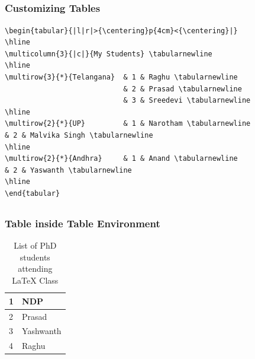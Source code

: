 \documentclass[12pt]{beamer}
\begin{document}
\begin{frame}[shrink=20,fragile]
\section{         }
\frametitle{Customizing Tables  }

\begin{verbatim}
\begin{tabular}{|l|r|>{\centering}p{4cm}<{\centering}|}
\hline
\multicolumn{3}{|c|}{My Students} \tabularnewline
\hline
\multirow{3}{*}{Telangana} 	& 1 & Raghu \tabularnewline
							& 2 & Prasad \tabularnewline
							& 3 & Sreedevi \tabularnewline
\hline
\multirow{2}{*}{UP} 		& 1 & Narotham \tabularnewline
& 2 & Malvika Singh \tabularnewline 
\hline
\multirow{2}{*}{Andhra} 	& 1 & Anand \tabularnewline
& 2 & Yaswanth \tabularnewline
\hline
\end{tabular}
\end{verbatim}
\end{frame}
\begin{frame}
\section{         }
\frametitle{Table inside Table Environment}
\begin{table}
	  \centering
	\label{table:1}
		\begin{tabular}{|p{2cm}|p{4cm}|}
		\hline
		1 &NDP\\		
		\hline
		2 &Prasad\\		
		\hline
		3 &Yashwanth\\		
		\hline
		4 &Raghu\\
		\hline
	\end{tabular}
		\caption{List of PhD students attending \LaTeX{} Class}
\end{table}
\end{frame}
\end{document}
